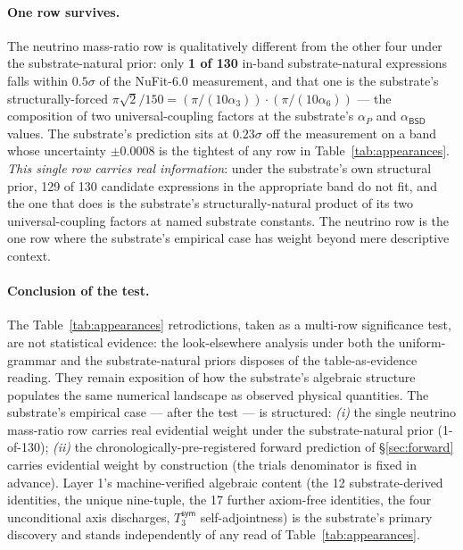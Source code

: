 \documentclass[11pt,a4paper]{amsart}
\theoremstyle{plain}
\theoremstyle{definition}
\begin{document}
\paragraph{One row survives.} The neutrino mass-ratio row is qualitatively different from the other four under the substrate-natural prior: only \textbf{1 of 130} in-band substrate-natural expressions falls within $0.5\sigma$ of the NuFit-6.0 measurement, and that one is the substrate's structurally-forced $\pi\sqrt{2}/150 = (\pi/(10\alpha_3)) \cdot (\pi/(10\alpha_6))$ --- the composition of two universal-coupling factors at the substrate's $\alpha_P$ and $\alpha_{\textsf{BSD}}$ values. The substrate's prediction sits at $0.23\sigma$ off the measurement on a band whose uncertainty $\pm 0.0008$ is the tightest of any row in Table~\ref{tab:appearances}. \emph{This single row carries real information}: under the substrate's own structural prior, 129 of 130 candidate expressions in the appropriate band do not fit, and the one that does is the substrate's structurally-natural product of its two universal-coupling factors at named substrate constants. The neutrino row is the one row where the substrate's empirical case has weight beyond mere descriptive context.

\paragraph{Conclusion of the test.} The Table~\ref{tab:appearances} retrodictions, taken as a multi-row significance test, are not statistical evidence: the look-elsewhere analysis under both the uniform-grammar and the substrate-natural priors disposes of the table-as-evidence reading. They remain exposition of how the substrate's algebraic structure populates the same numerical landscape as observed physical quantities. The substrate's empirical case --- after the test --- is structured: \emph{(i)} the single neutrino mass-ratio row carries real evidential weight under the substrate-natural prior (1-of-130); \emph{(ii)} the chronologically-pre-registered forward prediction of \S\ref{sec:forward} carries evidential weight by construction (the trials denominator is fixed in advance). Layer 1's machine-verified algebraic content (the 12 substrate-derived identities, the unique nine-tuple, the 17 further axiom-free identities, the four unconditional axis discharges, $T_3^{\textsf{sym}}$ self-adjointness) is the substrate's primary discovery and stands independently of any read of Table~\ref{tab:appearances}.
\end{document}

